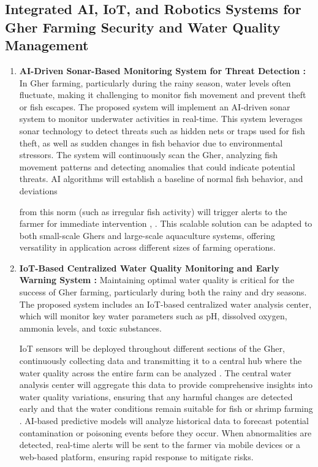 \documentclass[conference]{IEEEtran}
\begin{document}
\subsection{\textbf{Integrated AI, IoT, and Robotics Systems for Gher Farming Security and Water Quality Management}}
\begin{enumerate}
	\item \textbf{AI-Driven Sonar-Based Monitoring System for Threat Detection : }
In Gher farming, particularly during the rainy season, water levels often fluctuate, making it challenging to monitor fish movement and prevent theft or fish escapes. The proposed system will implement an AI-driven sonar system to monitor underwater activities in real-time. This system leverages sonar technology to detect threats such as hidden nets or traps used for fish theft, as well as sudden changes in fish behavior due to environmental stressors.
The system will continuously scan the Gher, analyzing fish movement patterns and detecting anomalies that could indicate potential threats. AI algorithms will establish a baseline of normal fish behavior, and deviations 

from this norm (such as irregular fish activity) will trigger alerts to the farmer for immediate intervention \cite{ref13}, \cite{ref14}. This scalable solution can be adapted to both small-scale Ghers and large-scale aquaculture systems, offering versatility in application across different sizes of farming operations.
	
	\item \textbf{IoT-Based Centralized Water Quality Monitoring and Early Warning System : }
	Maintaining optimal water quality is critical for the success of Gher farming, particularly during both the rainy and dry seasons. The proposed system includes an IoT-based centralized water analysis center, which will monitor key water parameters such as pH, dissolved oxygen, ammonia levels, and toxic substances.
	
IoT sensors will be deployed throughout different sections of the Gher, continuously collecting data and transmitting it to a central hub where the water quality across the entire farm can be analyzed \cite{ref18}. The central water analysis center will aggregate this data to provide comprehensive insights into water quality variations, ensuring that any harmful changes are detected early and that the water conditions remain suitable for fish or shrimp farming \cite{ref17}. AI-based predictive models will analyze historical data to forecast potential contamination or poisoning events before they occur. When abnormalities are detected, real-time alerts will be sent to the farmer via mobile devices or a web-based platform, ensuring rapid response to mitigate risks.



\end{enumerate}
\end{document}
